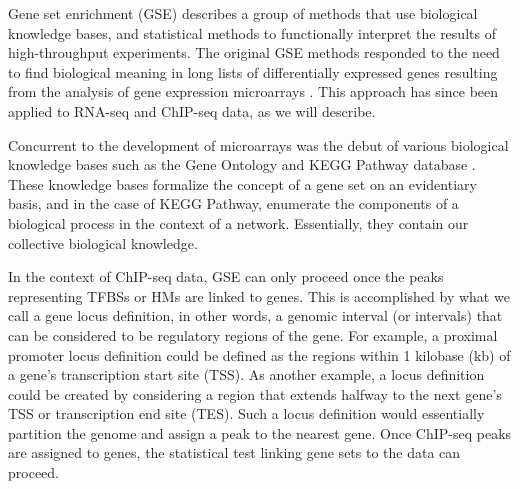 Gene set enrichment (GSE) describes a group of methods that use biological knowledge bases, and statistical methods to functionally interpret the results of high-throughput experiments. The original GSE methods responded to the need to find biological meaning in long lists of differentially expressed genes resulting from the analysis of gene expression microarrays \cite{Subramanian:2005jt}. This approach has since been applied to RNA-seq \cite{Young:2010ud, Lee:2016es} and ChIP-seq \cite{McLean:2010iq, Welch:2014fb} data, as we will describe.

Concurrent to the development of microarrays was the debut of various biological knowledge bases such as the Gene Ontology \cite{Ashburner:2000ja} and KEGG Pathway database \cite{Kanehisa:2000jn}. These knowledge bases formalize the concept of a gene set on an evidentiary basis, and in the case of KEGG Pathway, enumerate the components of a biological process in the context of a network. Essentially, they contain our collective biological knowledge.

In the context of ChIP-seq data, GSE can only proceed once the peaks representing TFBSs or HMs are linked to genes. This is accomplished by what we call a gene locus definition, in other words, a genomic interval (or intervals) that can be considered to be regulatory regions of the gene. For example, a proximal promoter locus definition could be defined as the regions within 1 kilobase (kb) of a gene's transcription start site (TSS). As another example, a locus definition could be created by considering a region that extends halfway to the next gene's TSS or transcription end site (TES). Such a locus definition would essentially partition the genome and assign a peak to the nearest gene. Once ChIP-seq peaks are assigned to genes, the statistical test linking gene sets to the data can proceed.

